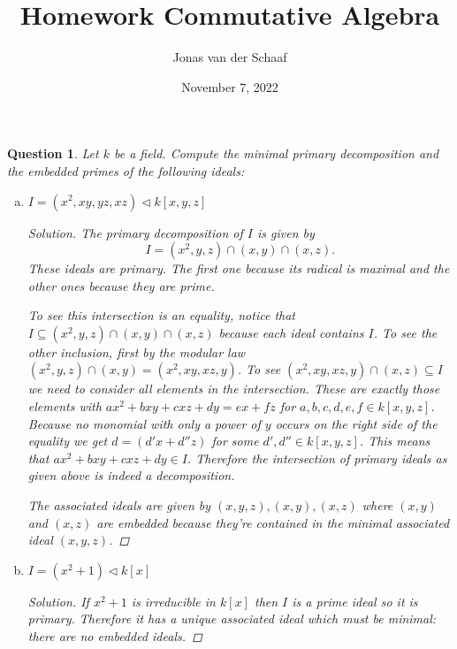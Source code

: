 \documentclass{article}
\title{Homework Commutative Algebra}
\author{Jonas van der Schaaf}
\date{November 7, 2022}
\newcommand{\ideal}{\triangleleft}
\newenvironment{solution}{\begin{proof}[Solution]\renewcommand\qedsymbol{}}{\end{proof}}
\newtheorem{question}{Question}
\theoremstyle{definition}
\begin{document}
\maketitle

\begin{question}
    Let \(k\) be a field. Compute the minimal primary decomposition and the
    embedded primes of the following ideals:
    \begin{enumerate}[(a)]
        \item \(I=(x^{2},xy,yz,xz)\ideal k[x,y,z]\)

              \begin{solution}
                  The primary decomposition of \(I\) is given by
                  \[
                      I=(x^{2},y,z)\cap(x,y)\cap(x,z).
                  \]
                  These ideals are primary. The first one because its radical is
                  maximal and the other ones because they are prime.

                  To see this intersection is an equality, notice that
                  \(I\subseteq(x^{2},y,z)\cap(x,y)\cap(x,z)\) because each ideal
                  contains \(I\). To see the other inclusion, first by the
                  modular law \((x^{2},y,z)\cap(x,y)=(x^{2},xy,xz,y)\). To see
                  \((x^{2},xy,xz,y)\cap(x,z)\subseteq I\) we need to consider
                  all elements in the intersection. These are exactly those
                  elements with \(ax^{2}+bxy+cxz+dy=ex+fz\) for \(a,b,c,d,e,f\in
                  k[x,y,z]\). Because no monomial with only a power of \(y\)
                  occurs on the right side of the equality we get
                  \(d=(d'x+d''z)\) for some \(d',d''\in k[x,y,z]\). This means
                  that \(ax^{2}+bxy+cxz+dy\in I\). Therefore the intersection
                  of primary ideals as given above is indeed a decomposition.

                  The associated ideals are given by \((x,y,z),(x,y),(x,z)\)
                  where \((x,y)\) and \((x,z)\) are embedded because they're
                  contained in the minimal associated ideal \((x,y,z)\).
              \end{solution}

        \item \(I=(x^{2}+1)\ideal k[x]\)

              \begin{solution}
                  If \(x^{2}+1\) is irreducible in \(k[x]\) then \(I\) is a
                  prime ideal so it is primary. Therefore it has a unique
                  associated ideal which must be minimal: there are no embedded
                  ideals.


\end{solution}
\end{enumerate}
\end{question}
\end{document}
